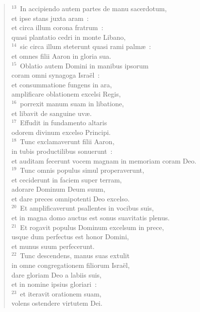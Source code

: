\begin{flushleft}
\begin{verse}
${}^{13}$~In accipiendo autem partes de manu sacerdotum,\\ et ipse stans juxta aram~:\\ et circa illum corona fratrum~:\\ quasi plantatio cedri in monte Libano,\\
${}^{14}$~sic circa illum steterunt quasi rami palm\ae~:\\ et omnes filii Aaron in gloria sua.\\
${}^{15}$~Oblatio autem Domini in manibus ipsorum\\ coram omni synagoga Isra\"el~:\\ et consummatione fungens in ara,\\ amplificare oblationem excelsi Regis,\\
${}^{16}$~porrexit manum suam in libatione,\\ et libavit de sanguine uv\ae .\\
${}^{17}$~Effudit in fundamento altaris\\ odorem divinum excelso Principi.\\
${}^{18}$~Tunc exclamaverunt filii Aaron,\\ in tubis productilibus sonuerunt~:\\ et auditam fecerunt vocem magnam in memoriam coram Deo.\\
${}^{19}$~Tunc omnis populus simul properaverunt,\\ et ceciderunt in faciem super terram,\\ adorare Dominum Deum suum,\\ et dare preces omnipotenti Deo excelso.\\
${}^{20}$~Et amplificaverunt psallentes in vocibus suis,\\ et in magna domo auctus est sonus suavitatis plenus.\\
${}^{21}$~Et rogavit populus Dominum excelsum in prece,\\ usque dum perfectus est honor Domini,\\ et munus suum perfecerunt.\\
${}^{22}$~Tunc descendens, manus suas extulit\\ in omne congregationem filiorum Isra\"el,\\ dare gloriam Deo a labiis suis,\\ et in nomine ipsius gloriari~:\\
${}^{23}$~et iteravit orationem suam,\\ volens ostendere virtutem Dei.\\

\end{verse}
\end{flushleft}
